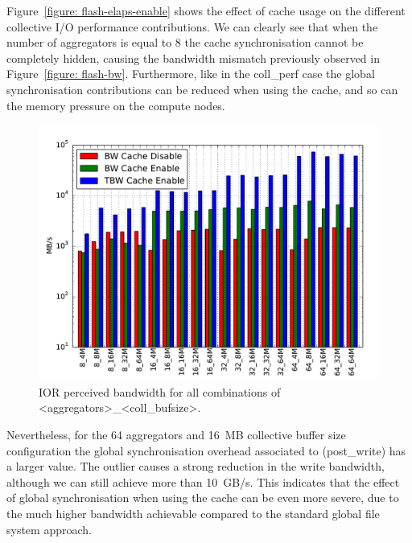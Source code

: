 Figure~\ref{figure: flash-elaps-enable} shows the effect of cache usage on the different collective I/O performance contributions. We can clearly see that when the number of aggregators is equal to 8 the cache synchronisation cannot be completely hidden, causing the bandwidth mismatch previously observed in Figure~\ref{figure: flash-bw}. Furthermore, like in the coll\_perf case the global synchronisation contributions can be reduced when using the cache, and so can the memory pressure on the compute nodes.
\begin{figure}[htb]
  \centering
  \includegraphics[width=0.95\columnwidth]{chapters/chapter3/figures/ior_32GB_30sec_bw}
  \caption{IOR perceived bandwidth for all combinations of <aggregators>\_<coll\_bufsize>.} %
  \label{figure: ior-bw}
\end{figure}
Nevertheless, for the 64 aggregators and 16~MB collective buffer size configuration the global synchronisation overhead associated to  (post\_write) has a larger value. The outlier causes a strong reduction in the write bandwidth, although we can still achieve more than 10~GB/s. This indicates that the effect of global synchronisation when using the cache can be even more severe, due to the much higher bandwidth achievable compared to the standard global file system approach.

